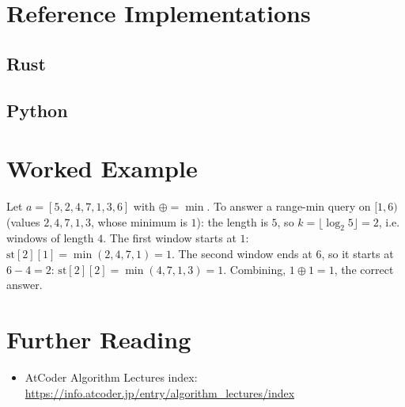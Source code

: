 \documentclass[11pt]{article}
\begin{document}
\section{Reference Implementations}

\codenote
\subsection{Rust}

\subsection{Python}

\section{Worked Example}
\begin{examplebox}
Let $a = [5, 2, 4, 7, 1, 3, 6]$ with $\oplus = \min$. To answer a range-min
query on $[1, 6)$ (values $2,4,7,1,3$, whose minimum is $1$): the length is
$5$, so $k = \lfloor \log_2 5 \rfloor = 2$, i.e. windows of length $4$. The
first window starts at $1$: $\mathrm{st}[2][1] = \min(2,4,7,1) = 1$. The
second window ends at $6$, so it starts at $6-4=2$:
$\mathrm{st}[2][2] = \min(4,7,1,3) = 1$. Combining, $1 \oplus 1 = 1$, the
correct answer.
\end{examplebox}

\section{Further Reading}
\begin{itemize}[leftmargin=1.5em]
  \item AtCoder Algorithm Lectures index: \url{https://info.atcoder.jp/entry/algorithm_lectures/index}
\end{itemize}
\end{document}

